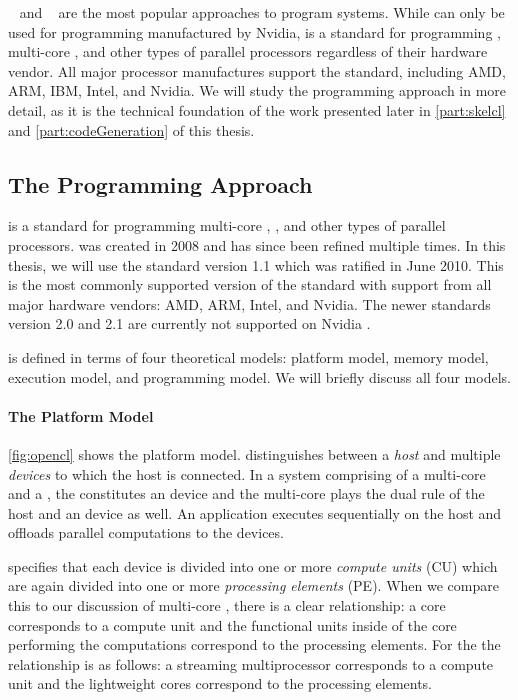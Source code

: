 \CUDA~\cite{CUDAProgrammingGuide} and \OpenCL~\cite{OpenCL} are the most popular approaches to program \GPU systems.
While \CUDA can only be used for programming \GPUs manufactured by Nvidia, \OpenCL is a standard for programming \GPUs, multi-core \CPUs, and other types of parallel processors regardless of their hardware vendor.
All major processor manufactures support the \OpenCL standard, including AMD, ARM, IBM, Intel, and Nvidia.
We will study the \OpenCL programming approach in more detail, as it is the technical foundation of the work presented later in \autoref{part:skelcl} and \autoref{part:codeGeneration} of this thesis.


\subsection{The \OpenCL Programming Approach}
\OpenCL is a standard for programming multi-core \CPUs, \GPUs, and other types of parallel processors.
\OpenCL was created in 2008 and has since been refined multiple times.
In this thesis, we will use the \OpenCL standard version 1.1 which was ratified in June 2010.
This is the most commonly supported version of the standard with support from all major hardware vendors: AMD, ARM, Intel, and Nvidia.
The newer \OpenCL standards version 2.0 and 2.1 are currently not supported on Nvidia \GPUs.

\OpenCL is defined in terms of four theoretical models: platform model, memory model, execution model, and programming model.
We will briefly discuss all four models.

\paragraph{The \OpenCL Platform Model}
\autoref{fig:opencl} shows the \OpenCL platform model.
\OpenCL distinguishes between a \emph{host} and multiple \OpenCL \emph{devices} to which the host is connected.
In a system comprising of a multi-core \CPU and a \GPU, the \GPU constitutes an \OpenCL device and the multi-core \CPU plays the dual rule of the host and an \OpenCL device as well.
An \OpenCL application executes sequentially on the host and offloads parallel computations to the \OpenCL devices.

\OpenCL specifies that each device is divided into one or more \emph{compute units} (CU) which are again divided into one or more \emph{processing elements} (PE).
When we compare this to our discussion of multi-core \CPUs, there is a clear relationship:
a \CPU core corresponds to a compute unit and the functional units inside of the \CPU core performing the computations correspond to the processing elements.
For the \GPU the relationship is as follows:
a streaming multiprocessor corresponds to a compute unit and the lightweight \GPU cores correspond to the processing elements.

